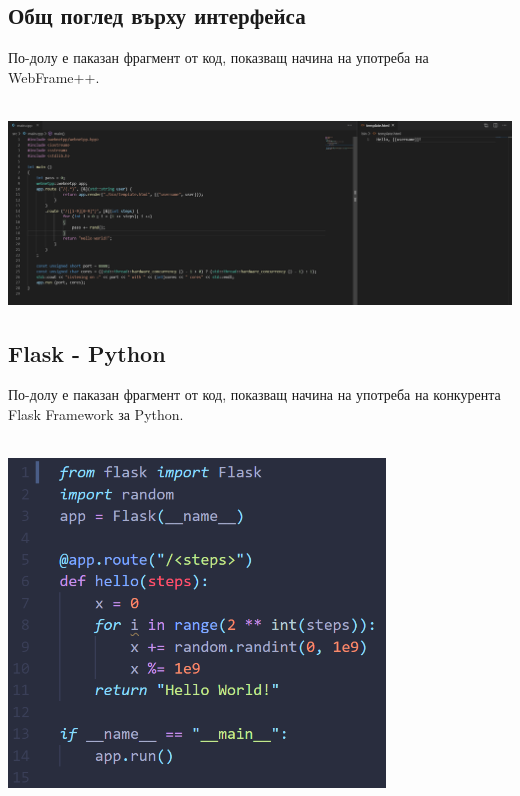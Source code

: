\documentclass[documentation.tex]{subfiles}
\begin{document}
\subsection{Общ поглед върху интерфейса} \label{interface}
    \begin{text}\par
    По-долу е паказан фрагмент от код, показващ начина на употреба на WebFrame++\cite{webframe}.
    \end{text}\\
    {\centering
    \includegraphics[width=1\textwidth]{images/new_version.png}
    }
\subsection{Flask - Python}
    \begin{text}\par
    По-долу е паказан фрагмент от код, показващ начина на употреба на конкурента Flask Framework за Python.
    \end{text}\\
    {\centering
    \includegraphics[width=0.75\textwidth]{images/flask.png}
    }
\end{document}
